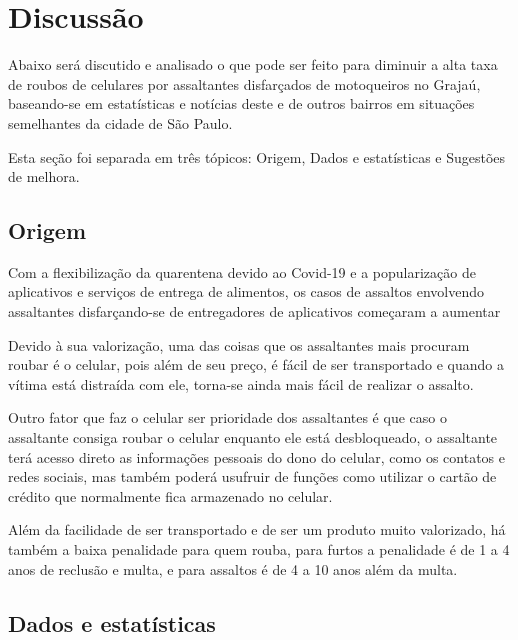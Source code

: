 \section{Discussão}

    Abaixo será discutido e analisado o que pode ser feito para diminuir a alta taxa de
    roubos de celulares por assaltantes disfarçados de motoqueiros no Grajaú, baseando-se
    em estatísticas e notícias deste e de outros bairros em situações semelhantes da cidade
    de São Paulo.

    Esta seção foi separada em três tópicos: Origem, Dados e estatísticas e Sugestões de melhora.

    \subsection{Origem}

        Com a flexibilização da quarentena devido ao Covid-19 e a popularização de aplicativos
        e serviços de entrega de alimentos, os casos de assaltos envolvendo assaltantes 
        disfarçando-se de entregadores de aplicativos começaram a aumentar 
        
        Devido à sua valorização, uma das coisas que os assaltantes mais procuram roubar é o
        celular, pois além de seu preço, é fácil de ser transportado e quando a vítima está
        distraída com ele, torna-se ainda mais fácil de realizar o assalto.
        
        Outro fator que faz o celular ser prioridade dos assaltantes é que caso o assaltante
        consiga roubar o celular enquanto ele está desbloqueado, o assaltante terá 
        acesso direto as informações pessoais do dono do celular, como os contatos e redes 
        sociais, mas também poderá usufruir de funções como utilizar o cartão de crédito que 
        normalmente fica armazenado no celular.

        Além da facilidade de ser transportado e de ser um produto muito valorizado, há também a
        baixa penalidade para quem rouba, para furtos a penalidade é de 1 a 4 anos de reclusão e 
        multa, e para assaltos é de 4 a 10 anos além da multa.

    \subsection{Dados e estatísticas}

